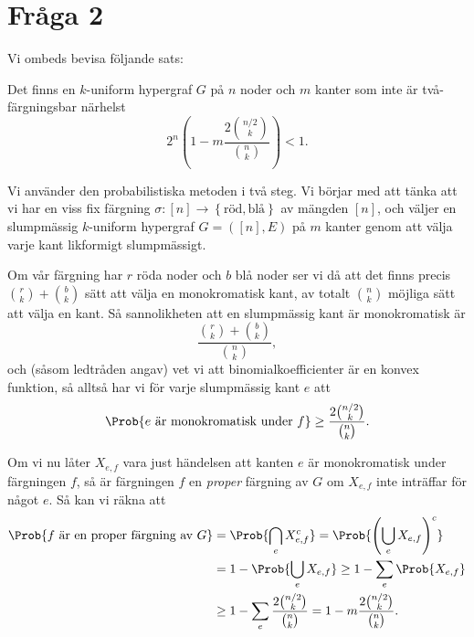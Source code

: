 \documentclass[nobib]{tufte-handout}
\begin{document}
\section{Fråga 2}

Vi ombeds bevisa följande sats:

\begin{theorem}[Erd\H{o}s, 1964]
  Det finns en $k$-uniform hypergraf $G$ på $n$ noder och $m$ kanter som inte är två-färgningsbar närhelst
  $$2^n\left(1 - m\frac{2\binom{n/2}{k}}{\binom{n}{k}}\right) < 1.$$
\end{theorem}

Vi använder den probabilistiska metoden i två steg. Vi börjar med att tänka att vi har en viss fix färgning $\sigma: [n] \to \left\{\text{röd}, \text{blå}\right\}$ av mängden $[n]$, och väljer en slumpmässig $k$-uniform hypergraf $G = ([n], E)$ på $m$ kanter genom att välja varje kant likformigt slumpmässigt.

Om vår färgning har $r$ röda noder och $b$ blå noder ser vi då att det finns precis $\binom{r}{k} + \binom{b}{k}$ sätt att välja en monokromatisk kant, av totalt $\binom{n}{k}$ möjliga sätt att välja en kant. Så sannolikheten att en slumpmässig kant är monokromatisk är
$$\frac{\binom{r}{k} + \binom{b}{k}}{\binom{n}{k}},$$
och (såsom ledtråden angav) vet vi att binomialkoefficienter är en konvex funktion, så alltså har vi för varje slumpmässig kant $e$ att
$$\Prob{e \text{ är monokromatisk under } f} \geq \frac{2\binom{n/2}{k}}{\binom{n}{k}}.$$

Om vi nu låter $X_{e,f}$ vara just händelsen att kanten $e$ är monokromatisk under färgningen $f$, så är färgningen $f$ en \emph{proper} färgning av $G$ om $X_{e,f}$ inte inträffar för något $e$. Så kan vi räkna att
\begin{align*}
  \Prob{f \text{ är en proper färgning av } G} &= \Prob{\bigcap_{e} X_{e,f}^c} = \Prob{\left(\bigcup_e X_{e,f}\right)^c} \\
  &= 1 - \Prob{\bigcup_e X_{e,f}} \geq 1 - \sum_e \Prob{X_{e,f}} \\
  &\geq 1 - \sum_ e \frac{2\binom{n/2}{k}}{\binom{n}{k}} = 1 - m\frac{2\binom{n/2}{k}}{\binom{n}{k}}.
\end{align*}
\end{document}
